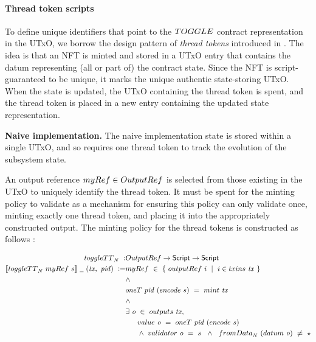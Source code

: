 \paragraph{Thread token scripts}

To define unique identifiers that point to the $\TOGGLE$ contract representation in the UTxO,
we borrow the design pattern of \emph{thread tokens} introduced in \cite{eutxoma}. The idea is that
an NFT is minted and stored in a UTxO entry that contains the datum representing (all
or part of) the contract
state. Since the NFT is script-guaranteed to be unique, it marks the unique authentic
state-storing UTxO.
When the state is updated, the UTxO containing the thread token is spent, and the
thread token is placed in a new entry containing the updated state representation.

\textbf{Naive implementation. }
The naive implementation state is stored within a single UTxO, and so requires
one thread token to track the evolution of the subsystem state.

An output reference $\mathsf{myRef} \in \OutputRef$ is
selected from those existing in the UTxO to uniquely identify the
thread token. It must be spent for the minting policy to validate
as a mechanism for ensuring this policy can only
validate once, minting exactly one thread token, and placing it into the
appropriately constructed output.
The minting policy for the thread tokens is constructed as follows :

  \begin{align*}
    \toggleTT_N~:& \OutputRef \to \Script \to \Script \\
    \applyMPScript{\toggleTT_N~ \mathsf{myRef}~s}~\wcard~(\var{tx},~\var{pid})~\leteq&
    \mathsf{myRef}~\in~ \{ ~\outputref~i~\mid~i \in \inputs~\var{tx}~\} \\
    & \wedge \\
    & \fun{oneT}~\var{pid}~(\fun{encode}~s) ~=~ \mint~\var{tx} \\
    & \wedge  \\
    &\exists~\var{o}~\in~\fun{outputs}~\var{tx}, \\
    &~~~~~\val~\var{o}~=~\mathsf{oneT}~\var{pid}~(\fun{encode}~s) \\
    & ~~~~~\wedge ~\validator~\var{o}~=~s~~\wedge ~~\fun{fromData}_N~(\datum~\var{o})~\neq~\emptytype
  \end{align*}

